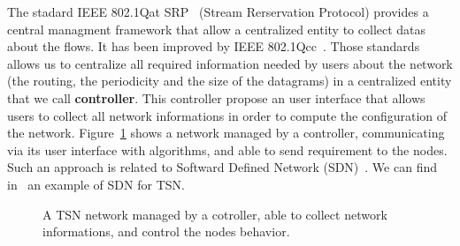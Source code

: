 The stadard IEEE 802.1Qat SRP~\cite{article} (Stream Rerservation Protocol) provides a central managment framework that allow a centralized entity to collect datas about the flows. It has been improved by IEEE 802.1Qcc~\cite{6755436}. Those standards allows us to centralize all required information needed by users about the network (the routing, the periodicity and the size of the datagrams) in a centralized entity that we call \textbf{controller}. This controller propose an user interface that allows users to collect all network informations in order to compute the configuration of the network. Figure~\ref{fig:networkcontroller} shows a network managed by a controller, communicating via its user interface with algorithms, and able to send requirement to the nodes. Such an approach is related to Softward Defined Network (SDN)~\cite{li2015software}. We can find in~\cite{7356556} an example of SDN for TSN.


\begin{figure}
\begin{center}


 \caption{A TSN network managed by a cotroller, able to collect network informations, and control the nodes behavior.}

\label{fig:networkcontroller}
\end{center}
\end{figure}


